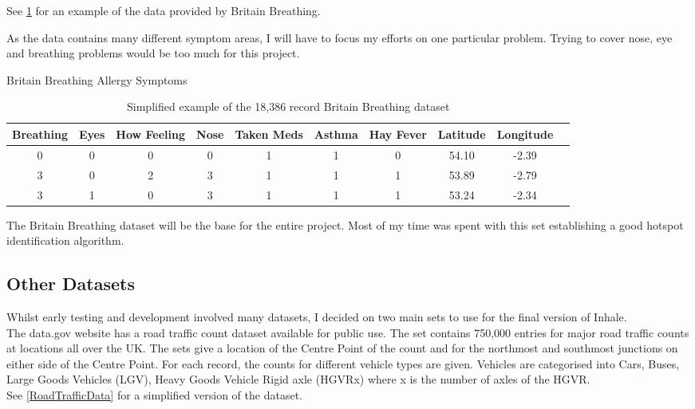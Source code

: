 See \ref{bbdatatable} for an example of the data provided by Britain Breathing.

As the data contains many different symptom areas, I will have to focus my efforts on one particular problem. Trying to cover nose, eye and breathing problems would be too much for this project.


\begin{table}
\begin{center}
Britain Breathing Allergy Symptoms\\
\begin{tabular}{|c|c|c|c|c|c|c|c|c|c}\hline\hline
Breathing&Eyes&How Feeling&Nose&Taken Meds&Asthma&Hay Fever&Latitude&Longitude\\\hline
0&0&0&0&1&1&0&54.10&-2.39\\
3&0&2&3&1&1&1&53.89&-2.79\\
3&1&0&3&1&1&1&53.24&-2.34\\\hline\hline
\end{tabular}
\end{center}
\caption{Simplified example of the 18,386 record Britain Breathing dataset}\label{bbdatatable}
\end{table}

The Britain Breathing dataset will be the base for the entire project. Most of my time was spent with this set establishing a good hotspot identification algorithm.

\subsection{Other Datasets}

Whilst early testing and development involved many datasets, I decided on two main sets to use for the final version of Inhale.\\

The data.gov website has a road traffic count dataset available for public use. The set contains  750,000 entries for major road traffic counts at locations all over the UK. The sets give a location of the Centre Point of the count and for the northmost and southmost junctions on either side of the Centre Point. For each record, the counts for different vehicle types are given. Vehicles are categorised into Cars, Buses, Large Goods Vehicles (LGV), Heavy Goods Vehicle Rigid axle (HGVRx) where x is the number of axles of the HGVR.\\

See \ref{RoadTrafficData} for a simplified version of the dataset.\\

